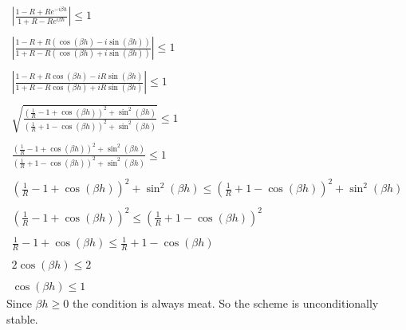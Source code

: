 \documentclass[11pt, a4paper]{article}
\begin{document}
\begin{equation}
    \begin{array}{c}
        \left|\displaystyle \frac{1-R+Re^{-i\beta h}}{1+R-Re^{i\beta h}}\right|\le1 \\\\
        \left|\displaystyle \frac{1-R+R\left(\cos\left(\beta h\right)-i\sin\left(\beta h\right)\right)}{1+R-R\left(\cos\left(\beta h\right)+i\sin\left(\beta h\right)\right)}\right|\le1 \\\\
        \left|\displaystyle \frac{1-R+R\cos\left(\beta h\right)-iR\sin\left(\beta h\right)}{1+R-R\cos\left(\beta h\right)+iR\sin\left(\beta h\right)}\right|\le1 \\\\
        \displaystyle\sqrt{\frac{\displaystyle\left(\frac{1}{R}-1+\cos\left(\beta h\right)\right)^2+\sin^2\left(\beta h\right)}{\displaystyle\left(\frac{1}{R}+1-\cos\left(\beta h\right)\right)^2+\sin^2\left(\beta h\right)}}\le1 \\\\
        \displaystyle\frac{\displaystyle\left(\frac{1}{R}-1+\cos\left(\beta h\right)\right)^2+\sin^2\left(\beta h\right)}{\displaystyle\left(\frac{1}{R}+1-\cos\left(\beta h\right)\right)^2+\sin^2\left(\beta h\right)}\le1 \\\\
        \displaystyle \left(\frac{1}{R}-1+\cos\left(\beta h\right)\right)^2+\sin^2\left(\beta h\right)\le\displaystyle \left(\frac{1}{R}+1-\cos\left(\beta h\right)\right)^2+\sin^2\left(\beta h\right) \\\\
        \displaystyle \left(\frac{1}{R}-1+\cos\left(\beta h\right)\right)^2\le\displaystyle \left(\frac{1}{R}+1-\cos\left(\beta h\right)\right)^2 \\\\
        \displaystyle \frac{1}{R}-1+\cos\left(\beta h\right)\le\frac{1}{R}+1-\cos\left(\beta h\right) \\\\
        \displaystyle 2\cos\left(\beta h\right)\le2 \\\\
        \displaystyle \cos\left(\beta h\right)\le1
    \end{array}
\end{equation}
Since $\beta h\ge0$ the condition is always meat. So the scheme is unconditionally stable.
\end{document}
